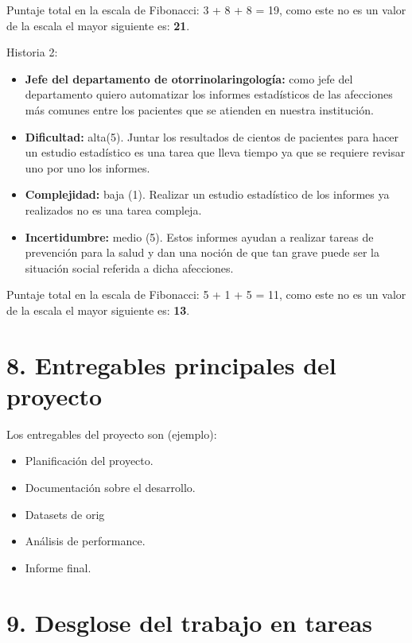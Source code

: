 \documentclass[
11pt, %
]{charter}
\begin{document}
Puntaje total en la escala de Fibonacci: 3 + 8 + 8 = 19, como este no es un valor de la escala el mayor siguiente es: \textbf{21}.

Historia 2:
\begin{itemize}
	\item \textbf{Jefe del departamento de otorrinolaringología:} como jefe del departamento quiero automatizar los 
	informes estadísticos de las afecciones más comunes entre los pacientes que se atienden en nuestra institución.
\end{itemize}

\begin{itemize}
	\item \textbf{Dificultad:} alta(5). Juntar los resultados de cientos de pacientes para hacer un estudio estadístico es
	una tarea que lleva tiempo ya que se requiere revisar uno por uno los informes.
	\item \textbf{Complejidad:} baja (1). Realizar un estudio estadístico de los informes ya realizados no es una tarea 
	compleja.
	\item \textbf{Incertidumbre:} medio (5). Estos informes ayudan a realizar tareas de prevención para la salud y dan 
	una noción de que tan grave puede ser la situación social referida a dicha afecciones.
\end{itemize}

Puntaje total en la escala de Fibonacci: 5 + 1 + 5 = 11, como este no es un valor de la escala el mayor siguiente es: \textbf{13}.


\section{8. Entregables principales del proyecto}
\label{sec:entregables}

Los entregables del proyecto son (ejemplo):

\begin{itemize}
	\item Planificación del proyecto.
	\item Documentación sobre el desarrollo.
	\item Datasets de orig
	\item Análisis de performance.
	\item Informe final.
\end{itemize}

\section{9. Desglose del trabajo en tareas}
\label{sec:wbs}
\end{document}
